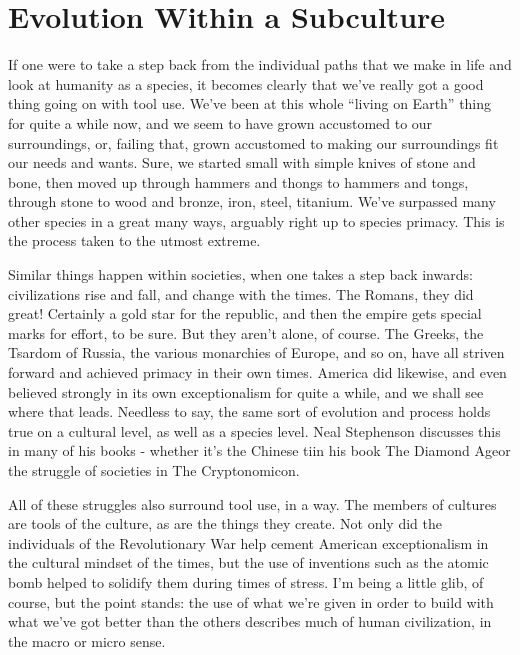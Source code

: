 \section*{Evolution Within a Subculture}

If one were to take a step back from the individual paths that we make in life and look at humanity as a species, it becomes clearly that we've really got a good thing going on with tool use. We've been at this whole ``living on Earth'' thing for quite a while now, and we seem to have grown accustomed to our surroundings, or, failing that, grown accustomed to making our surroundings fit our needs and wants. Sure, we started small with simple knives of stone and bone, then moved up through hammers and thongs to hammers and tongs, through stone to wood and bronze, iron, steel, titanium. We've surpassed many other species in a great many ways, arguably right up to species primacy. This is the process taken to the utmost extreme.

Similar things happen within societies, when one takes a step back inwards: civilizations rise and fall, and change with the times. The Romans, they did great! Certainly a gold star for the republic, and then the empire gets special marks for effort, to be sure. But they aren't alone, of course. The Greeks, the Tsardom of Russia, the various monarchies of Europe, and so on, have all striven forward and achieved primacy in their own times. America did likewise, and even believed strongly in its own exceptionalism for quite a while, and we shall see where that leads. Needless to say, the same sort of evolution and process holds true on a cultural level, as well as a species level. Neal Stephenson discusses this in many of his books - whether it's the Chinese tiin his book The Diamond Ageor the struggle of societies in The Cryptonomicon.

All of these struggles also surround tool use, in a way. The members of cultures are tools of the culture, as are the things they create. Not only did the individuals of the Revolutionary War help cement American exceptionalism in the cultural mindset of the times, but the use of inventions such as the atomic bomb helped to solidify them during times of stress. I'm being a little glib, of course, but the point stands: the use of what we're given in order to build with what we've got better than the others describes much of human civilization, in the macro or micro sense.

